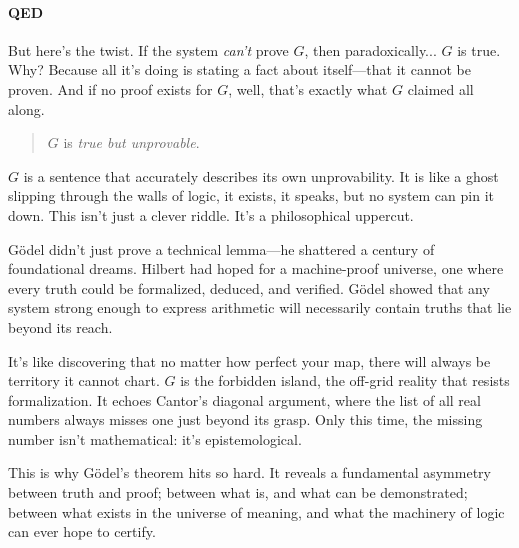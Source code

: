 \vspace{1em}


\paragraph{QED} But here's the twist. If the system \emph{can’t} prove \( G \), then paradoxically... \( G \) is true. Why? Because all it's doing is stating a fact about itself—that it cannot be proven. And if no proof exists for \( G \), well, that’s exactly what \( G \) claimed all along.

\begin{quote}
\( G \) is \emph{true but unprovable}. 
\end{quote}

\( G \) is a sentence that accurately describes its own unprovability. It is like a ghost slipping through the walls of logic, it exists, it speaks, but no system can pin it down. This isn’t just a clever riddle. It’s a philosophical uppercut.

Gödel didn’t just prove a technical lemma—he shattered a century of foundational dreams. Hilbert had hoped for a machine-proof universe, one where every truth could be formalized, deduced, and verified. Gödel showed that any system strong enough to express arithmetic will necessarily contain truths that lie beyond its reach.

It’s like discovering that no matter how perfect your map, there will always be territory it cannot chart. \( G \) is the forbidden island, the off-grid reality that resists formalization. It echoes Cantor’s diagonal argument, where the list of all real numbers always misses one just beyond its grasp. Only this time, the missing number isn’t mathematical: it’s epistemological.

This is why Gödel’s theorem hits so hard. It reveals a fundamental asymmetry between truth and proof; between what is, and what can be demonstrated; between what exists in the universe of meaning, and what the machinery of logic can ever hope to certify.

\vspace{1em}

